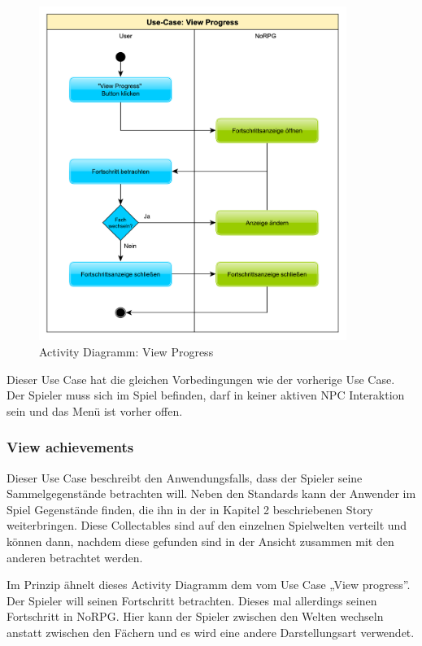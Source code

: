 			\begin{figure}[htbp]
				\centering 
				\label{umlViewProgess}
				\includegraphics[width=10cm]{pics/ViewProgress.pdf}
				\caption{Activity Diagramm: View Progress}
			\end{figure}
	
			Dieser Use Case hat die gleichen Vorbedingungen wie der vorherige Use Case. Der Spieler muss sich im Spiel befinden, darf in keiner aktiven \ac{NPC} Interaktion sein und das Menü ist vorher offen.
	
		\subsubsection{View achievements}
			Dieser Use Case beschreibt den Anwendungsfalls, dass der Spieler seine Sammelgegenstände betrachten will. Neben den Standards kann der Anwender im Spiel Gegenstände finden, die ihn in der in Kapitel 2 beschriebenen Story weiterbringen. Diese Collectables sind auf den einzelnen Spielwelten verteilt und können dann, nachdem diese gefunden sind in der Ansicht zusammen mit den anderen betrachtet werden.
			
			Im Prinzip ähnelt dieses Activity Diagramm dem vom Use Case „View progress”. Der Spieler will seinen Fortschritt betrachten. Dieses mal allerdings seinen Fortschritt in NoRPG. Hier kann der Spieler zwischen den Welten wechseln anstatt zwischen den Fächern und es wird eine andere Darstellungsart verwendet.
			
